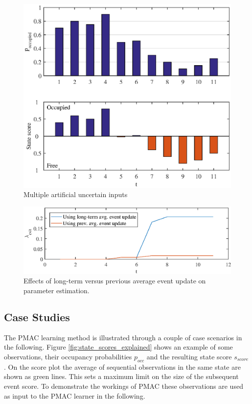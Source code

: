 \begin{figure}[htbp]
    \centering
    \includegraphics[scale=1]{chapters/mapping_of_dynamic_areas/figures/pmac_noise_problem_case}
    \caption{Multiple artificial uncertain inputs}
    \label{fig:pmac_noise_problem_case}
\end{figure}


\begin{figure}[htbp]
    \centering
    \includegraphics[scale=1]{chapters/mapping_of_dynamic_areas/figures/visualization_of_advantage_long_term_average}
    \caption{Effects of long-term versus previous average event update on parameter estimation.}
    \label{fig:visualization_of_advantage_long_term_average}
\end{figure}

\subsection{Case Studies}
The PMAC learning method is illustrated through a couple of case scenarios in the following. 
Figure \ref{fig:state_scores_explained} shows an example of some observations, their occupancy probabilities $p_{occ}$ and the resulting state score $s_{score}$. On the score plot the average of sequential observations in the same state are shown as green lines. This sets a maximum limit on the size of the subsequent event score. To demonstrate the workings of PMAC these observations are used as input to the PMAC learner in the following. 


